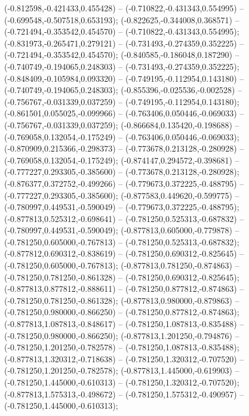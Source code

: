  (-0.812598,-0.421433,0.455428) -- (-0.710822,-0.431343,0.554995) -- (-0.699548,-0.507518,0.653193);
 (-0.822625,-0.344008,0.368571) -- (-0.721494,-0.353542,0.454570) -- (-0.710822,-0.431343,0.554995);
 (-0.831973,-0.265471,0.279121) -- (-0.731493,-0.274359,0.352225) -- (-0.721494,-0.353542,0.454570);
 (-0.840585,-0.186048,0.187290) -- (-0.740749,-0.194065,0.248303) -- (-0.731493,-0.274359,0.352225);
 (-0.848409,-0.105984,0.093320) -- (-0.749195,-0.112954,0.143180) -- (-0.740749,-0.194065,0.248303);
 (-0.855396,-0.025536,-0.002528) -- (-0.756767,-0.031339,0.037259) -- (-0.749195,-0.112954,0.143180);
 (-0.861501,0.055025,-0.099966) -- (-0.763406,0.050446,-0.069033) -- (-0.756767,-0.031339,0.037259);
 (-0.866684,0.135420,-0.198688) -- (-0.769058,0.132054,-0.175249) -- (-0.763406,0.050446,-0.069033);
 (-0.870909,0.215366,-0.298373) -- (-0.773678,0.213128,-0.280928) -- (-0.769058,0.132054,-0.175249);
 (-0.874147,0.294572,-0.398681) -- (-0.777227,0.293305,-0.385600) -- (-0.773678,0.213128,-0.280928);
 (-0.876377,0.372752,-0.499266) -- (-0.779673,0.372225,-0.488795) -- (-0.777227,0.293305,-0.385600);
 (-0.877583,0.449620,-0.599775) -- (-0.780997,0.449531,-0.590049) -- (-0.779673,0.372225,-0.488795);
 (-0.877813,0.525312,-0.698641) -- (-0.781250,0.525313,-0.687832) -- (-0.780997,0.449531,-0.590049);
 (-0.877813,0.605000,-0.779878) -- (-0.781250,0.605000,-0.767813) -- (-0.781250,0.525313,-0.687832);
 (-0.877812,0.690312,-0.838619) -- (-0.781250,0.690312,-0.825645) -- (-0.781250,0.605000,-0.767813);
 (-0.877813,0.781250,-0.874863) -- (-0.781250,0.781250,-0.861328) -- (-0.781250,0.690312,-0.825645);
 (-0.877813,0.877812,-0.888611) -- (-0.781250,0.877812,-0.874863) -- (-0.781250,0.781250,-0.861328);
 (-0.877813,0.980000,-0.879863) -- (-0.781250,0.980000,-0.866250) -- (-0.781250,0.877812,-0.874863);
 (-0.877813,1.087813,-0.848617) -- (-0.781250,1.087813,-0.835488) -- (-0.781250,0.980000,-0.866250);
 (-0.877813,1.201250,-0.794876) -- (-0.781250,1.201250,-0.782578) -- (-0.781250,1.087813,-0.835488);
 (-0.877813,1.320312,-0.718638) -- (-0.781250,1.320312,-0.707520) -- (-0.781250,1.201250,-0.782578);
 (-0.877813,1.445000,-0.619903) -- (-0.781250,1.445000,-0.610313) -- (-0.781250,1.320312,-0.707520);
 (-0.877813,1.575313,-0.498672) -- (-0.781250,1.575312,-0.490957) -- (-0.781250,1.445000,-0.610313);
